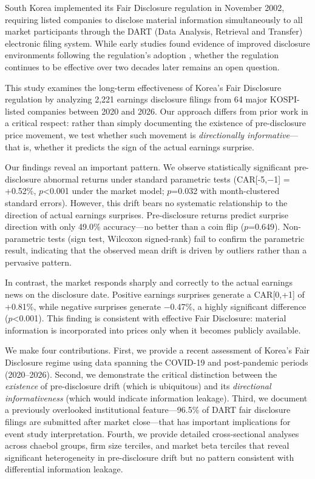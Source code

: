 \documentclass[review,authoryear]{elsarticle}
\begin{document}
South Korea implemented its Fair Disclosure regulation in November 2002, requiring listed companies to disclose material information simultaneously to all market participants through the DART (Data Analysis, Retrieval and Transfer) electronic filing system. While early studies found evidence of improved disclosure environments following the regulation's adoption \citep{yun2012fair, oh2017disclosure}, whether the regulation continues to be effective over two decades later remains an open question.

This study examines the long-term effectiveness of Korea's Fair Disclosure regulation by analyzing 2,221 earnings disclosure filings from 64 major KOSPI-listed companies between 2020 and 2026. Our approach differs from prior work in a critical respect: rather than simply documenting the existence of pre-disclosure price movement, we test whether such movement is \textit{directionally informative}---that is, whether it predicts the sign of the actual earnings surprise.

Our findings reveal an important pattern. We observe statistically significant pre-disclosure abnormal returns under standard parametric tests (CAR[-5,$-$1] = +0.52\%, $p$<0.001 under the market model; $p$=0.032 with month-clustered standard errors). However, this drift bears no systematic relationship to the direction of actual earnings surprises. Pre-disclosure returns predict surprise direction with only 49.0\% accuracy---no better than a coin flip ($p$=0.649). Non-parametric tests (sign test, Wilcoxon signed-rank) fail to confirm the parametric result, indicating that the observed mean drift is driven by outliers rather than a pervasive pattern.

In contrast, the market responds sharply and correctly to the actual earnings news on the disclosure date. Positive earnings surprises generate a CAR[0,+1] of +0.81\%, while negative surprises generate $-$0.47\%, a highly significant difference ($p$<0.001). This finding is consistent with effective Fair Disclosure: material information is incorporated into prices only when it becomes publicly available.

We make four contributions. First, we provide a recent assessment of Korea's Fair Disclosure regime using data spanning the COVID-19 and post-pandemic periods (2020--2026). Second, we demonstrate the critical distinction between the \textit{existence} of pre-disclosure drift (which is ubiquitous) and its \textit{directional informativeness} (which would indicate information leakage). Third, we document a previously overlooked institutional feature---96.5\% of DART fair disclosure filings are submitted after market close---that has important implications for event study interpretation. Fourth, we provide detailed cross-sectional analyses across chaebol groups, firm size terciles, and market beta terciles that reveal significant heterogeneity in pre-disclosure drift but no pattern consistent with differential information leakage.
\end{document}
